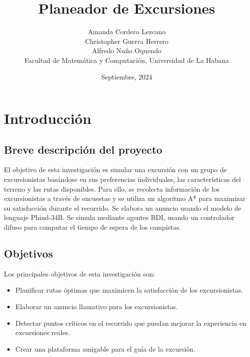 \documentclass[10pt,twocolumn]{article}
\begin{document}
	\title{Planeador de Excursiones}
	\author{
		Amanda Cordero Lezcano\\
		Christopher Guerra Herrero\\
		Alfredo Nuño Oquendo\\Facultad de Matemática y Computación, Universidad de La Habana
	}
	\date{Septiembre, 2024}
	
	\section{Introducción}
	\subsection{Breve descripción del proyecto}
	El objetivo de esta investigación es simular una excursión con un grupo de excursionistas basándose en sus preferencias individuales, las características del terreno y las rutas disponibles. Para ello, se recolecta información de los excursionistas a través de encuestas y se utiliza un algoritmo A* para maximizar su satisfacción durante el recorrido. Se elabora un anuncio usando el modelo de lenguaje Phind-34B. Se simula mediante agentes BDI, usando un controlador difuso para computar el tiempo de espera de los campistas.
	
	\subsection{Objetivos}
	Los principales objetivos de esta investigación son:
	\begin{itemize}
		\item Planificar rutas óptimas que maximicen la satisfacción de los excursionistas.
		\item Elaborar un anuncio llamativo para los excursionistas.
		\item Detectar puntos críticos en el recorrido que puedan mejorar la experiencia en excursiones reales.
		\item Crear una plataforma amigable para el guía de la excursión.
	\end{itemize}
	
\end{document}
